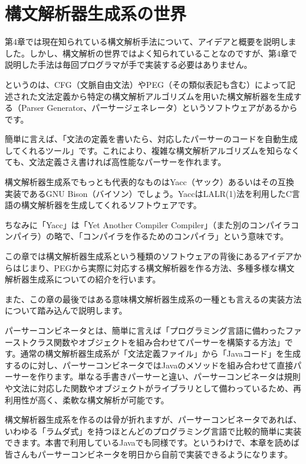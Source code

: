 \thispagestyle{empty}
\chapter{構文解析器生成系の世界}\label{ch05}

第4章では現在知られている構文解析手法について、アイデアと概要を説明しました。しかし、構文解析の世界ではよく知られていることなのですが、第4章で説明した手法は毎回プログラマが手で実装する必要はありません。

というのは、CFG（文脈自由文法）やPEG（その類似表記も含む）によって記述された文法定義から特定の構文解析アルゴリズムを用いた構文解析器を生成する（Parser
Generator、パーサージェネレータ）というソフトウェアがあるからです。

簡単に言えば、「文法の定義を書いたら、対応したパーサーのコードを自動生成してくれるツール」です。これにより、複雑な構文解析アルゴリズムを知らなくても、文法定義さえ書ければ高性能なパーサーを作れます。

構文解析器生成系でもっとも代表的なものはYacc（ヤック）あるいはその互換実装であるGNU
Bison（バイソン）でしょう。YaccはLALR(1)法を利用したC言語の構文解析器を生成してくれるソフトウェアです。

ちなみに「Yacc」は「Yet Another Compiler
Compiler」（また別のコンパイラコンパイラ）の略で、「コンパイラを作るためのコンパイラ」という意味です。

この章では構文解析器生成系という種類のソフトウェアの背後にあるアイデアからはじまり、PEGから実際に対応する構文解析器を作る方法、多種多様な構文解析器生成系についての紹介を行います。

また、この章の最後ではある意味構文解析器生成系の一種とも言えるの実装方法について踏み込んで説明します。

パーサーコンビネータとは、簡単に言えば「プログラミング言語に備わったファーストクラス関数やオブジェクトを組み合わせてパーサーを構築する方法」です。通常の構文解析器生成系が「文法定義ファイル」から「Javaコード」を生成するのに対し、パーサーコンビネータではJavaのメソッドを組み合わせて直接パーサーを作ります。単なる手書きパーサーと違い、パーサーコンビネータは規則や文法に対応した関数やオブジェクトがライブラリとして備わっているため、再利用性が高く、柔軟な構文解析が可能です。

構文解析器生成系を作るのは骨が折れますが、パーサーコンビネータであれば、いわゆる「ラムダ式」を持つほとんどのプログラミング言語で比較的簡単に実装できます。本書で利用しているJavaでも同様です。というわけで、本章を読めば皆さんもパーサーコンビネータを明日から自前で実装できるようになります。

